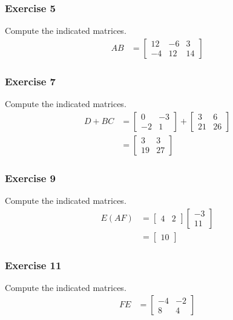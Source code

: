 \documentclass{math}
\begin{document}
\subsubsection*{Exercise 5}
Compute the indicated matrices.
\begin{align*}
  AB &= \begin{bmatrix}
    12 & -6 & 3 \\
    -4 & 12 & 14
  \end{bmatrix}
\end{align*}

\subsubsection*{Exercise 7}
Compute the indicated matrices.
\begin{align*}
  D+BC &= \begin{bmatrix}
    0 & -3 \\
    -2 & 1
  \end{bmatrix}+\begin{bmatrix}
    3 & 6 \\
    21 & 26
  \end{bmatrix} \\
  &= \begin{bmatrix}
    3 & 3 \\
    19 & 27
  \end{bmatrix}
\end{align*}

\subsubsection*{Exercise 9}
Compute the indicated matrices.
\begin{align*}
  E(AF) &= \begin{bmatrix}
    4 & 2
  \end{bmatrix}\begin{bmatrix}
    -3 \\ 11
  \end{bmatrix} \\
  &= \begin{bmatrix}10\end{bmatrix}
\end{align*}

\subsubsection*{Exercise 11}
Compute the indicated matrices.
\begin{align*}
  FE &= \begin{bmatrix}
    -4 & -2 \\
    8 & 4
  \end{bmatrix}
\end{align*}
\end{document}
